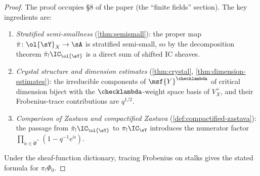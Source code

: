 \begin{proof}
  The proof occupies §8 of the paper (the ``finite fields'' section).
  The key ingredients are:
  \begin{enumerate}
    \item \emph{Stratified semi-smallness} (\cref{thm:semismall}): the proper map
          \( \bar\pi \colon \ol{\sY}_X \to \sA \) is stratified semi-small, so by the
          decomposition theorem \( \bar\pi_! \IC_{\ol{\sY}} \) is a direct sum of shifted
          IC sheaves.
    \item \emph{Crystal structure and dimension estimates} (\cref{thm:crystal},
          \cref{thm:dimension-estimates}): the irreducible components of
          \( \msf{Y}^{\checklambda} \) of critical dimension biject with the
          \( \checklambda \)-weight space basis of \( V_X^+ \), and their Frobenius-trace
          contributions are \( q^{1/2} \).
    \item \emph{Comparison of Zastava and compactified Zastava} (\cref{def:compactified-zastava}):
          the passage from \( \bar\pi_!\IC_{\ol{\sY}} \) to \( \pi_!\IC_{\sY} \)
          introduces the numerator factor
          \( \prod_{\check\alpha \in \check\Phi^+}(1-q^{-1}e^{\check\alpha}) \).
  \end{enumerate}
  Under the sheaf-function dictionary, tracing Frobenius on stalks gives the stated
  formula for \( \pi_!\Phi_0 \).
\end{proof}

